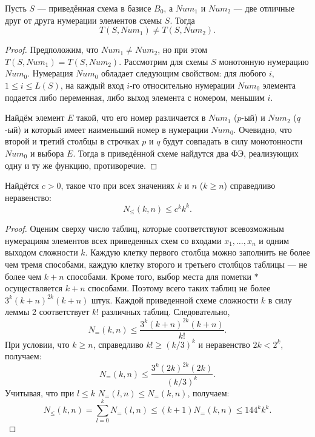 \begin{lemma}
    Пусть $S$ --- приведённая схема в базисе $B_0$, а $Num_1$ и $Num_2$ --- две отличные друг от друга нумерации элементов схемы $S$. Тогда
    \[
        T(S, Num_1) \neq T(S, Num_2).
    \]
\end{lemma}

\begin{proof}
    Предположим, что $Num_1 \neq Num_2$, но при этом $T(S, Num_1) = T(S, Num_2)$. Рассмотрим для схемы $S$ монотонную нумерацию $Num_0$.  Нумерация $Num_0$ обладает следующим свойством: для любого $i$, $1 \leqslant i \leqslant L(S)$, на каждый вход $i$-го относительно нумерации $Num_0$ элемента подается либо переменная, либо выход элемента с номером, меньшим $i$.

    Найдём элемент $E$ такой, что его номер различается в $Num_1$ ($p$-ый) и $Num_2$ ($q$-ый) и который имеет наименьший номер в нумерации $Num_0$. Очевидно, что второй и третий столбцы в строчках $p$ и $q$ будут совпадать в силу монотонности $Num_0$ и выбора $E$. Тогда в приведённой схеме найдутся два ФЭ, реализующих одну и ту же функцию, противоречие.
\end{proof}

\begin{lemma}
    Найдётся $c>0$, такое что при всех значениях $k$ и $n$ ($k \geqslant n$) справедливо неравенство:
    \[
        N_{\leqslant}(k,n)\leqslant c^k k^k.
    \]
\end{lemma}

\begin{proof}
    Оценим сверху число таблиц, которые соответствуют всевозможным нумерациям элементов всех приведенных схем со входами $x_1, \ldots, x_n$ и одним выходом сложности $k$. Каждую клетку первого столбца можно заполнить не более чем тремя способами, каждую клетку второго и третьего столбцов таблицы --- не более чем $k+n$ способами. Кроме того, выбор места для пометки $*$ осуществляется $k+n$ способами. Поэтому всего таких таблиц не более $3^k(k + n)^{2k}(k + n)$ штук. Каждой приведенной схеме сложности $k$ в силу леммы 2 соответствует $k!$ различных таблиц. Следовательно,
    \[
        N_=(k, n) \leqslant \frac{3^k(k+n)^{2k}(k+n)}{k!}.
    \]
    При условии, что $k\geqslant n$, справедливо $k!\geqslant (k/3)^k$ и неравенство $2k<2^k$, получаем:
    \[
        N_= (k, n) \leqslant \frac{3^k(2k)^{2k}(2k)}{(k/3)^k}.
    \]
    Учитывая, что при $l\leqslant k$ $N_=(l, n) \leqslant N_= (k, n)$, получаем:
    \[
        N_{\leqslant} (k, n) = \sum_{l=0}^k N_=(l,n) \leqslant (k+1) N_=(k, n) \leqslant 144^k k^k.
    \]
\end{proof}

